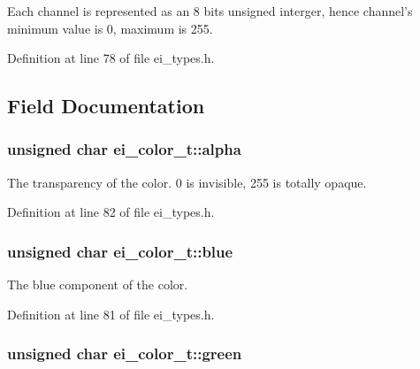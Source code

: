 Each channel is represented as an 8 bits unsigned interger, hence channel's minimum value is 0, maximum is 255. 

Definition at line 78 of file ei\+\_\+types.\+h.



\subsection{Field Documentation}
\hypertarget{structei__color__t_af213a14356db920b1a04f5270263ae61}{
\subsubsection[{alpha}]{\setlength{\rightskip}{0pt plus 5cm}unsigned char ei\+\_\+color\+\_\+t\+::alpha}}\label{structei__color__t_af213a14356db920b1a04f5270263ae61}


The transparency of the color. 0 is invisible, 255 is totally opaque. 



Definition at line 82 of file ei\+\_\+types.\+h.

\hypertarget{structei__color__t_af8d67b7a72cbb586519b55033350fb8c}{
\subsubsection[{blue}]{\setlength{\rightskip}{0pt plus 5cm}unsigned char ei\+\_\+color\+\_\+t\+::blue}}\label{structei__color__t_af8d67b7a72cbb586519b55033350fb8c}


The blue component of the color. 



Definition at line 81 of file ei\+\_\+types.\+h.

\hypertarget{structei__color__t_ad85ce262fb9c76fe3c52b4eed19505d1}{
\subsubsection[{green}]{\setlength{\rightskip}{0pt plus 5cm}unsigned char ei\+\_\+color\+\_\+t\+::green}}\label{structei__color__t_ad85ce262fb9c76fe3c52b4eed19505d1}


